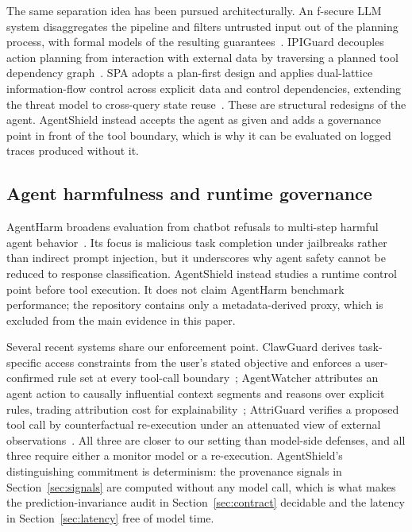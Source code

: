 \documentclass[letterpaper,twocolumn,10pt]{article}
\begin{document}
The same separation idea has been pursued architecturally. An f-secure LLM
system disaggregates the pipeline and filters untrusted input out of the
planning process, with formal models of the resulting
guarantees~\cite{wu2024systemlevel}. IPIGuard decouples action planning from
interaction with external data by traversing a planned tool dependency
graph~\cite{an2025ipiguard}. SPA adopts a plan-first design and applies
dual-lattice information-flow control across explicit data and control
dependencies, extending the threat model to cross-query state
reuse~\cite{girrens2026spa}. These are structural redesigns of the agent.
AgentShield instead accepts the agent as given and adds a governance point in
front of the tool boundary, which is why it can be evaluated on logged traces
produced without it.

\subsection{Agent harmfulness and runtime governance}
\label{sec:rw:gov}

AgentHarm broadens evaluation from chatbot refusals to multi-step harmful agent
behavior~\cite{andriushchenko2025agentharm}. Its focus is malicious task
completion under jailbreaks rather than indirect prompt injection, but it
underscores why agent safety cannot be reduced to response classification.
AgentShield instead studies a runtime control point before tool execution. It
does not claim AgentHarm benchmark performance; the repository contains only a
metadata-derived proxy, which is excluded from the main evidence in this paper.

Several recent systems share our enforcement point. ClawGuard derives
task-specific access constraints from the user's stated objective and enforces
a user-confirmed rule set at every tool-call
boundary~\cite{zhao2026clawguard}; AgentWatcher attributes an agent action to
causally influential context segments and reasons over explicit rules, trading
attribution cost for explainability~\cite{wang2026agentwatcher}; AttriGuard
verifies a proposed tool call by counterfactual re-execution under an
attenuated view of external
observations~\cite{he2026attriguard}. All three are closer to our setting than
model-side defenses, and all three require either a monitor model or a
re-execution. AgentShield's distinguishing commitment is determinism: the
provenance signals in Section~\ref{sec:signals} are computed without any model
call, which is what makes the prediction-invariance audit in
Section~\ref{sec:contract} decidable and the latency in
Section~\ref{sec:latency} free of model time.
\end{document}
